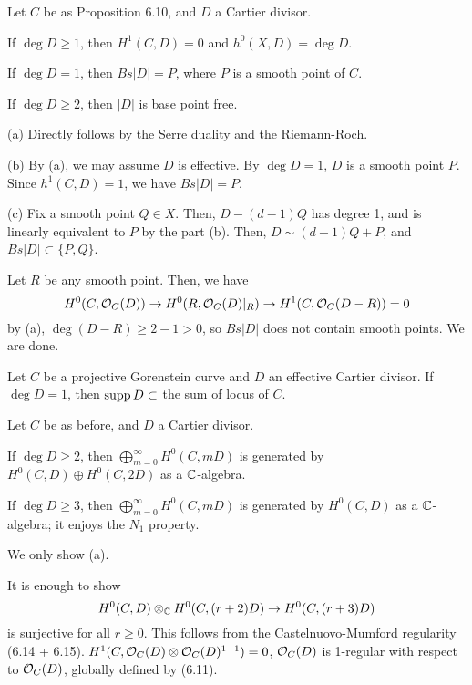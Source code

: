 \documentclass{../../small}
\begin{document}
\begin{prop}
Let $C$ be as Proposition 6.10, and $D$ a Cartier divisor.
\begin{parts}
\item If $\deg D\ge1$, then $H^1(C,D)=0$ and $h^0(X,D)=\deg D$.
\item If $\deg D=1$, then $Bs|D|=P$, where $P$ is a smooth point of $C$.
\item If $\deg D\ge2$, then $|D|$ is base point free.
\end{parts}
\end{prop}
\begin{pf}
(a) Directly follows by the Serre duality and the Riemann-Roch.

(b) By (a), we may assume $D$ is effective.
By $\deg D=1$, $D$ is a smooth point $P$.
Since $h^1(C,D)=1$, we have $Bs|D|=P$.

(c)
Fix a smooth point $Q\in X$.
Then, $D-(d-1)Q$ has degree 1, and is linearly equivalent to $P$ by the part (b).
Then, $D\sim(d-1)Q+P$, and $Bs|D|\subset\{P,Q\}$.

Let $R$ be any smooth point.
Then, we have
\[H^0(C,\mathcal{O}_C(D))\to H^0(R,\mathcal{O}_C(D)|_R)\to H^1(C,\mathcal{O}_C(D-R))=0\]
by (a), $\deg(D-R)\ge2-1>0$, so $Bs|D|$ does not contain smooth points.
We are done.
\end{pf}

\begin{exe}
Let $C$ be a projective Gorenstein curve and $D$ an effective Cartier divisor.
If $\deg D=1$, then $\operatorname{supp} D\subset$ the sum of locus of $C$.
\end{exe}

\begin{prop}
Let $C$ be as before, and $D$ a Cartier divisor.
\begin{parts}
\item If $\deg D\ge2$, then $\bigoplus_{m=0}^\infty H^0(C,mD)$ is generated by $H^0(C,D)\oplus H^0(C,2D)$ as a $\mathbb{C}$-algebra.
\item If $\deg D\ge3$, then $\bigoplus_{m=0}^\infty H^0(C,mD)$ is generated by $H^0(C,D)$ as a $\mathbb{C}$-algebra; it enjoys the $N_1$ property.
\end{parts}
\end{prop}
\begin{pf}
We only show (a).

It is enough to show
\[H^0(C,D)\otimes_{\mathbb{C}} H^0(C,(r+2)D)\to H^0(C,(r+3)D)\]
is surjective for all $r\ge0$.
This follows from the Castelnuovo-Mumford regularity (6.14 + 6.15).
$H^1(C,\mathcal{O}_C(D)\otimes\mathcal{O}_C(D)^{1-1})=0$, $\mathcal{O}_C(D)$ is 1-regular with respect to $\mathcal{O}_C(D)$, globally defined by (6.11).

\end{pf}
\end{document}
